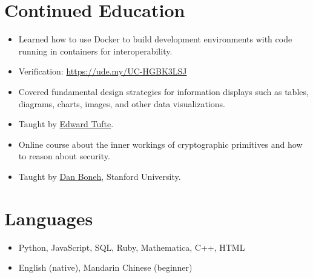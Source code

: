 \documentclass{cultvoucher}
\begin{document}
\section{Continued Education}
\begin{itemize}
    \item Learned how to use Docker to build development environments with code
          running in containers for interoperability.
    \item Verification: \url{https://ude.my/UC-HGBK3LSJ}
\end{itemize}
\begin{itemize}
    \item Covered fundamental design strategies for information displays
          such as tables, diagrams, charts, images, and other data
          visualizations.
    \item Taught by \href{https://www.edwardtufte.com/tufte/}{Edward Tufte}.
\end{itemize}
\begin{itemize}
    \item Online course about the inner workings of cryptographic primitives
          and how to reason about security.
    \item Taught by \href{https://crypto.stanford.edu/~dabo/}{Dan Boneh}, Stanford University.
\end{itemize}

\section{Languages}
\begin{itemize}
      \item Python, JavaScript, SQL, Ruby, Mathematica, C++, HTML
      \item English (native), Mandarin Chinese (beginner)
\end{itemize}
\end{document}
